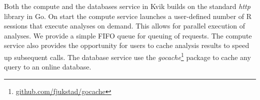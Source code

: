 Both the compute and the databases service in Kvik builds on the standard
\emph{http} library in Go. On start the compute service 
launches a user-defined number of R sessions that execute analyses on demand.
This allows for parallel execution of analyses. We provide a simple FIFO queue
for queuing of requests. The compute service also provides the opportunity for users to
cache analysis results to speed up subsequent calls. The database service use
the \emph{gocache}\footnote{\url{github.com/fjukstad/gocache}} package to cache
any query to an online database.

% 
% 
% 
% 
% 

